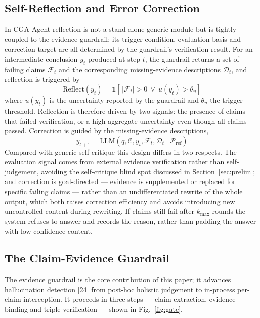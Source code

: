 \documentclass[journal,10pt,a4paper]{IEEEtran}
\begin{document}
\subsection{Self-Reflection and Error Correction}
In CGA-Agent reflection is not a stand-alone generic module but is tightly coupled to the evidence guardrail: its trigger condition, evaluation basis and correction target are all determined by the guardrail's verification result. For an intermediate conclusion $y_t$ produced at step $t$, the guardrail returns a set of failing claims $\mathcal{F}_t$ and the corresponding missing-evidence descriptions $\mathcal{D}_t$, and reflection is triggered by
\begin{equation}
\mathrm{Reflect}(y_t)=\mathbf{1}\!\left[\,\lvert\mathcal{F}_t\rvert>0\ \vee\ u(y_t)>\theta_u\right]
\end{equation}
where $u(y_t)$ is the uncertainty reported by the guardrail and $\theta_u$ the trigger threshold. Reflection is therefore driven by two signals: the presence of claims that failed verification, or a high aggregate uncertainty even though all claims passed. Correction is guided by the missing-evidence descriptions,
\begin{equation}
y_{t+1}=\mathrm{LLM}(q,\mathcal{C},y_t,\mathcal{F}_t,\mathcal{D}_t\mid\mathcal{P}_{\mathrm{ref}})
\end{equation}
Compared with generic self-critique this design differs in two respects. The evaluation signal comes from external evidence verification rather than self-judgement, avoiding the self-critique blind spot discussed in Section~\ref{sec:prelim}; and correction is goal-directed --- evidence is supplemented or replaced for specific failing claims --- rather than an undifferentiated rewrite of the whole output, which both raises correction efficiency and avoids introducing new uncontrolled content during rewriting. If claims still fail after $k_{\max}$ rounds the system refuses to answer and records the reason, rather than padding the answer with low-confidence content.

\subsection{The Claim-Evidence Guardrail}
\label{sec:guardrail}
The evidence guardrail is the core contribution of this paper; it advances hallucination detection [24] from post-hoc holistic judgement to in-process per-claim interception. It proceeds in three steps --- claim extraction, evidence binding and triple verification --- shown in Fig.~\ref{fig:gate}.
\end{document}
